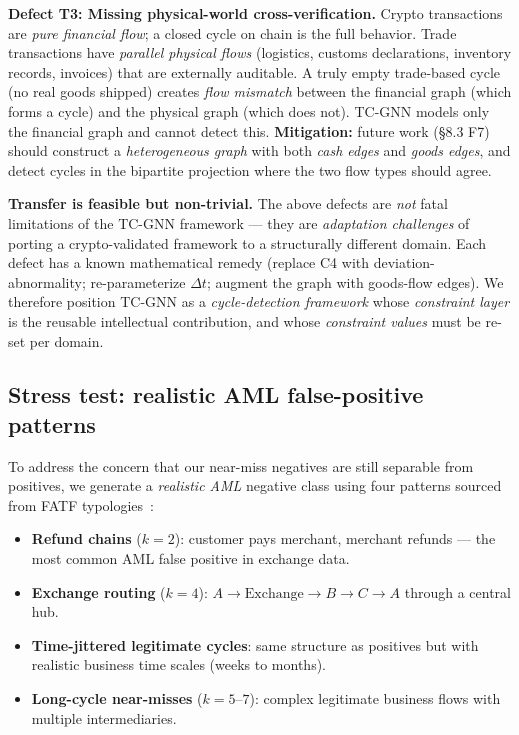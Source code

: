 \documentclass[journal,onecolumn]{IEEEtran}
\begin{document}
\textbf{Defect T3: Missing physical-world cross-verification.}
Crypto transactions are \emph{pure financial flow}; a closed cycle on
chain is the full behavior. Trade transactions have \emph{parallel
physical flows} (logistics, customs declarations, inventory records,
invoices) that are externally auditable. A truly empty trade-based
cycle (no real goods shipped) creates \emph{flow mismatch} between
the financial graph (which forms a cycle) and the physical graph
(which does not). TC-GNN models only the financial graph and cannot
detect this. \textbf{Mitigation:} future work (§8.3 F7) should
construct a \emph{heterogeneous graph} with both \emph{cash edges} and
\emph{goods edges}, and detect cycles in the bipartite projection
where the two flow types should agree.

\textbf{Transfer is feasible but non-trivial.} The above defects are
\emph{not} fatal limitations of the TC-GNN framework --- they are
\emph{adaptation challenges} of porting a crypto-validated framework to
a structurally different domain. Each defect has a known
mathematical remedy (replace C4 with deviation-abnormality;
re-parameterize $\Delta t$; augment the graph with goods-flow edges).
We therefore position TC-GNN as a \emph{cycle-detection framework}
whose \emph{constraint layer} is the reusable intellectual contribution,
and whose \emph{constraint values} must be re-set per domain.

\subsection{Stress test: realistic AML false-positive patterns}
\label{sec:exp-stress}

To address the concern that our near-miss negatives are still separable
from positives, we generate a \emph{realistic AML} negative class using
four patterns sourced from FATF typologies~\cite{fatfTypologies2022}:

\begin{itemize}
\item \textbf{Refund chains} ($k{=}2$): customer pays merchant, merchant
refunds --- the most common AML false positive in exchange data.
\item \textbf{Exchange routing} ($k{=}4$): $A \to \text{Exchange} \to B
\to C \to A$ through a central hub.
\item \textbf{Time-jittered legitimate cycles}: same structure as
positives but with realistic business time scales (weeks to months).
\item \textbf{Long-cycle near-misses} ($k{=}5$--$7$): complex legitimate
business flows with multiple intermediaries.
\end{itemize}
\end{document}
